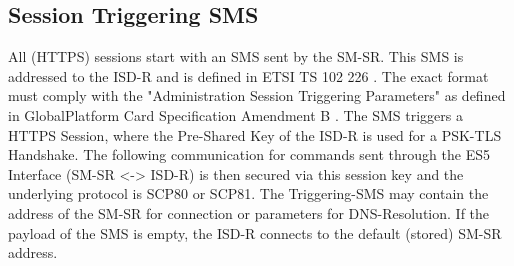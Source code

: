 \subsection{Session Triggering SMS}\label{sec:M2MSMS}
All (HTTPS) sessions start with an SMS sent by the SM-SR. This SMS is addressed to the ISD-R and is defined in ETSI TS 102 226 \parencite{TS102:226}. The exact format must comply with the "Administration Session Triggering Parameters" as defined in GlobalPlatform Card Specification Amendment B \parencite{GPC:AmendB}.
The SMS triggers a HTTPS Session, where the Pre-Shared Key of the ISD-R is used for a PSK-TLS Handshake. The following communication for commands sent through the ES5 Interface (SM-SR <-> ISD-R) is then secured via this session key and the underlying protocol is SCP80 or SCP81.
The Triggering-SMS may contain the address of the SM-SR for connection or parameters for DNS-Resolution. If the payload of the SMS is empty, the ISD-R connects to the default (stored) SM-SR address. 
